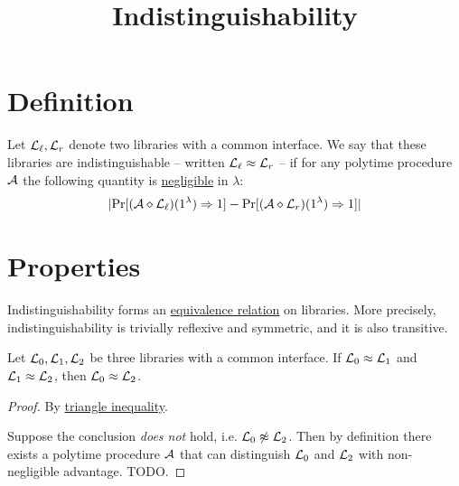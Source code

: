 \documentclass{article}
\title{Indistinguishability}
\begin{document}
\maketitle

\section{Definition}

\begin{definition}[Indistinguishability]
  Let $\mathcal{L}_\ell, \mathcal{L}_r$ denote two libraries with a common interface. We say
  that these libraries are indistinguishable -- written $\mathcal{L}_\ell \approx \mathcal{L}_r$ -- if for any polytime
  procedure $\mathcal{A}$ the following quantity is \href{negligible.html}{negligible} in $\lambda$:
  \begin{align*}
    |\mathrm{Pr}[(\mathcal{A} \diamond \mathcal{L}_\ell)(1^\lambda) \Rightarrow 1]
    -
    \mathrm{Pr}[(\mathcal{A} \diamond \mathcal{L}_r)(1^\lambda) \Rightarrow 1]|
  \end{align*}
\end{definition}

\section{Properties}

Indistinguishability forms an
\href{https://en.wikipedia.org/wiki/Equivalence_relation}{equivalence relation}
on libraries.
More precisely, indistinguishability is trivially reflexive and symmetric, and it is also transitive.

\begin{lemma}
  Let $\mathcal{L}_0, \mathcal{L}_1, \mathcal{L}_2$ be three libraries with a common interface. If
    $\mathcal{L}_0 \approx \mathcal{L}_1$ and $\mathcal{L}_1 \approx \mathcal{L}_2$,
    then $\mathcal{L}_0 \approx \mathcal{L}_2$.
\end{lemma}
\begin{proof}
  By \href{https://en.wikipedia.org/wiki/Triangle_inequality}{triangle inequality}.

  Suppose the conclusion \emph{does not} hold, i.e. $\mathcal{L}_0 \not \approx \mathcal{L}_2$.
  Then by definition there exists a polytime procedure $\mathcal{A}$ that can distinguish $\mathcal{L}_0$ and $\mathcal{L}_2$ with non-negligible advantage.
  TODO.
\end{proof}
\end{document}

